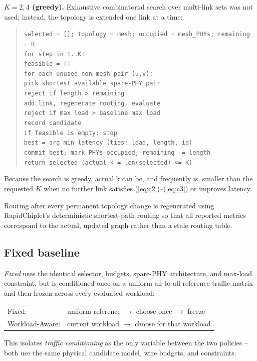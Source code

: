 \documentclass[conference]{IEEEtran}
\begin{document}
\textbf{$K{=}2,4$ (greedy).} Exhaustive combinatorial search over multi-link sets was not used; instead, the topology is extended one link at a time:
\begin{quote}\small
\texttt{selected = []; topology = mesh; occupied = mesh\_PHYs; remaining = B}\\
\texttt{for step in 1..K:}\\
\texttt{\quad feasible = []}\\
\texttt{\quad for each unused non-mesh pair (u,v):}\\
\texttt{\qquad pick shortest available spare-PHY pair}\\
\texttt{\qquad reject if length > remaining}\\
\texttt{\qquad add link, regenerate routing, evaluate}\\
\texttt{\qquad reject if max load > baseline max load}\\
\texttt{\qquad record candidate}\\
\texttt{\quad if feasible is empty: stop}\\
\texttt{\quad best = arg min latency (ties: load, length, id)}\\
\texttt{\quad commit best; mark PHYs occupied; remaining -= length}\\
\texttt{return selected  (actual\_k = len(selected) <= K)}
\end{quote}
Because the search is greedy, $\mathrm{actual\_k}$ can be, and frequently is, smaller than the requested $K$ when no further link satisfies (\ref{eq:c2})--(\ref{eq:c3}) or improves latency.

Routing after every permanent topology change is regenerated using RapidChiplet's deterministic shortest-path routing so that all reported metrics correspond to the actual, updated graph rather than a stale routing table.

\subsection{Fixed baseline}
\textit{Fixed} uses the identical selector, budgets, spare-PHY architecture, and max-load constraint, but is conditioned once on a uniform all-to-all reference traffic matrix and then frozen across every evaluated workload:
\begin{center}
\small
\begin{tabular}{ll}
Fixed: & uniform reference $\to$ choose once $\to$ freeze\\
Workload-Aware: & current workload $\to$ choose for that workload\\
\end{tabular}
\end{center}
This isolates \emph{traffic conditioning} as the only variable between the two policies -- both use the same physical candidate model, wire budgets, and constraints.
\end{document}
